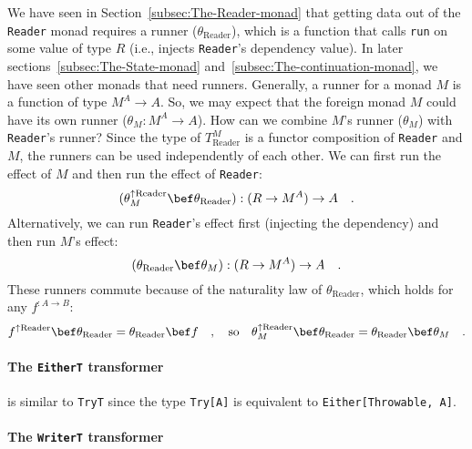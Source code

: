We have seen in Section~\ref{subsec:The-Reader-monad} that getting
data out of the \lstinline!Reader! monad requires a runner ($\theta_{\text{Reader}}$),
which is a function that calls \lstinline!run! on some value of type
$R$ (i.e., injects \lstinline!Reader!\textsf{'}s dependency value). In later
sections~\ref{subsec:The-State-monad} and~\ref{subsec:The-continuation-monad},
we have seen other monads that need runners. Generally, a runner for
a monad $M$ is a function of type $M^{A}\rightarrow A$. So, we may
expect that the foreign monad $M$ could have its own runner ($\theta_{M}:M^{A}\rightarrow A$).
How can we combine $M$\textsf{'}s runner ($\theta_{M}$) with \lstinline!Reader!\textsf{'}s
runner? Since the type of $T_{\text{Reader}}^{M}$ is a functor composition
of \lstinline!Reader! and $M$, the runners can be used independently
of each other. We can first run the effect of $M$ and then run the
effect of \lstinline!Reader!:
\[
(\theta_{M}^{\uparrow\text{Reader}}\bef\theta_{\text{Reader}}):(R\rightarrow M^{A})\rightarrow A\quad.
\]
Alternatively, we can run \lstinline!Reader!\textsf{'}s effect first (injecting
the dependency) and then run $M$\textsf{'}s effect:
\[
(\theta_{\text{Reader}}\bef\theta_{M}):(R\rightarrow M^{A})\rightarrow A\quad.
\]
These runners commute because of the naturality law of $\theta_{\text{Reader}}$,
which holds for any $f^{:A\rightarrow B}$:
\[
f^{\uparrow\text{Reader}}\bef\theta_{\text{Reader}}=\theta_{\text{Reader}}\bef f\quad,\quad\text{so}\quad\theta_{M}^{\uparrow\text{Reader}}\bef\theta_{\text{Reader}}=\theta_{\text{Reader}}\bef\theta_{M}\quad.
\]


\paragraph{The \texttt{EitherT} transformer}

is similar to \lstinline!TryT! since the type \lstinline!Try[A]!
is equivalent to \lstinline!Either[Throwable, A]!.

\paragraph{The \texttt{WriterT} transformer}

